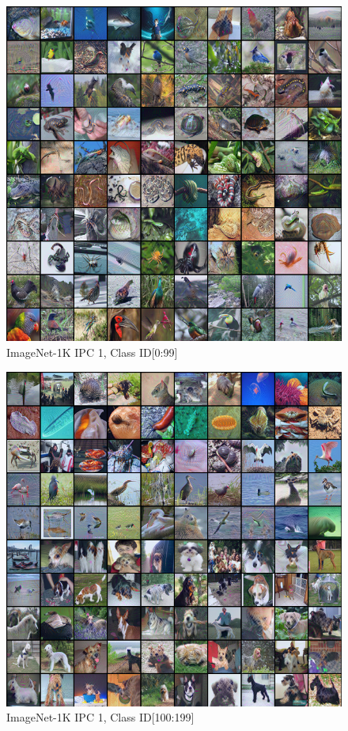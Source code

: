 \documentclass[10pt,twocolumn,letterpaper]{article}
\begin{document}
\begin{figure}
    \centering
    \includegraphics[width=\textwidth]{images/appendix/row-1-column-1.png}
    \caption{ImageNet-1K IPC 1, Class ID[0:99]}
\end{figure}
\begin{figure}
    \centering
    \includegraphics[width=\textwidth]{images/appendix/row-2-column-1.png}
    \caption{ImageNet-1K IPC 1, Class ID[100:199]}
\end{figure}
\end{document}
